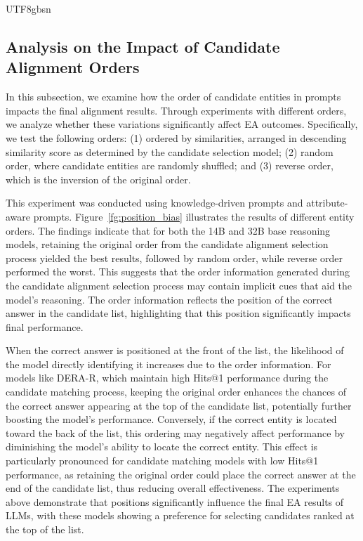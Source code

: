\documentclass[preprint,12pt]{elsarticle}
\begin{document}
\begin{CJK}{UTF8}{gbsn}
\subsection{Analysis on the Impact of Candidate Alignment Orders}

In this subsection, we examine how the order of candidate entities in prompts impacts the final alignment results. Through experiments with different orders, we analyze whether these variations significantly affect EA outcomes. Specifically, we test the following orders: (1) ordered by similarities, arranged in descending similarity score as determined by the candidate selection model; (2) random order, where candidate entities are randomly shuffled; and (3) reverse order, which is the inversion of the original order.

This experiment was conducted using knowledge-driven prompts and attribute-aware prompts. 
Figure~\ref{fg:position_bias} illustrates the results of different entity orders. The findings indicate that for both the 14B and 32B base reasoning models, retaining the original order from the candidate alignment selection process yielded the best results, followed by random order, while reverse order performed the worst. This suggests that the order information generated during the candidate alignment selection process may contain implicit cues that aid the model's reasoning. The order information reflects the position of the correct answer in the candidate list, highlighting that this position significantly impacts final performance.

When the correct answer is positioned at the front of the list, the likelihood of the model directly identifying it increases due to the order information. For models like DERA-R, which maintain high Hits@1 performance during the candidate matching process, keeping the original order enhances the chances of the correct answer appearing at the top of the candidate list, potentially further boosting the model's performance. Conversely, if the correct entity is located toward the back of the list, this ordering may negatively affect performance by diminishing the model's ability to locate the correct entity. This effect is particularly pronounced for candidate matching models with low Hits@1 performance, as retaining the original order could place the correct answer at the end of the candidate list, thus reducing overall effectiveness.
The experiments above demonstrate that positions significantly influence the final EA results of LLMs, with these models showing a preference for selecting candidates ranked at the top of the list.


\end{CJK}
\end{document}
